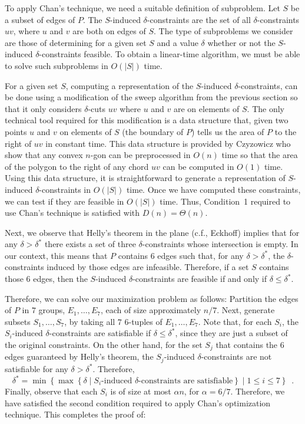 \documentclass{ws-ijcga}
\begin{document}
To apply Chan's technique, we need a suitable definition of
subproblem.  Let $S$ be a subset of edges of $P$.  The $S$-induced
$\delta$-constraints are the set of all $\delta$-constraints $uv$,
where $u$ and $v$ are both on edges of $S$.  The type of subproblems
we consider are those of determining for a given set $S$ and a value
$\delta$ whether or not the $S$-induced $\delta$-constraints feasible.
To obtain a linear-time algorithm, we must be able to solve such
subproblems in $O(|S|)$ time.

For a given set $S$, computing a representation of the $S$-induced
$\delta$-constraints, can be done using a modification of the sweep
algorithm from the previous section so that it only considers
$\delta$-cuts $uv$ where $u$ and $v$ are on elements of $S$.  The only
technical tool required for this modification is a data structure
that, given two points $u$ and $v$ on elements of $S$ (the boundary of
$P$) tells us the area of $P$ to the right of $uv$ in constant time.
This data structure is provided by Czyzowicz \etal\cite{ccu98} who
show that any convex $n$-gon can be preprocessed in $O(n)$ time so
that the area of the polygon to the right of any chord $uv$ can be
computed in $O(1)$ time.  Using this data structure, it is
straightforward to generate a representation of $S$-induced
$\delta$-constraints in $O(|S|)$ time.  Once we have computed these
constraints, we can test if they are feasible in $O(|S|)$ time.  Thus,
Condition~1 required to use Chan's technique is satisfied with
$D(n)=\Theta(n)$.

Next, we observe that Helly's theorem in the plane (c.f.,
Eckhoff\cite{e93}) implies that for any $\delta>\delta^*$ there exists
a set of three $\delta$-constraints whose intersection is empty.  In
our context, this means that $P$ contains 6 edges such that, for any
$\delta>\delta^*$, the $\delta$-constraints induced by those edges are
infeasible.  Therefore, if a set $S$ contains those 6 edges, then the
$S$-induced $\delta$-constraints are feasible if and only if
$\delta\le\delta^*$.

Therefore, we can solve our maximization problem as follows: Partition
the edges of $P$ in $7$ groups, $E_1,\ldots,E_7$, each of size
approximately $n/7$.  Next, generate subsets $S_1,\ldots,S_7$, by
taking all $7$ 6-tuples of $E_1,\ldots,E_7$.  Note that, for each
$S_i$, the $S_i$-induced $\delta$-constraints are satisfiable if
$\delta\le\delta^*$, since they are just a subset of the original
constraints.  On the other hand, for the set $S_j$ that contains the 6
edges guaranteed by Helly's theorem, the $S_j$-induced
$\delta$-constraints are not satisfiable for any $\delta>\delta^*$.
Therefore,
\[
\delta^* = \min\left\{\max\left\{\delta \mid 
	\mbox{$S_i$-induced $\delta$-constraints are satisfiable} 
	\right\} \mid 1\le i\le 7\right\} \enspace .
\]
Finally, observe that each $S_i$ is of size at most $\alpha n$, for
$\alpha=6/7$.  Therefore, we have satisfied the second condition
required to apply Chan's optimization technique.  This completes the
proof of:
\end{document}
